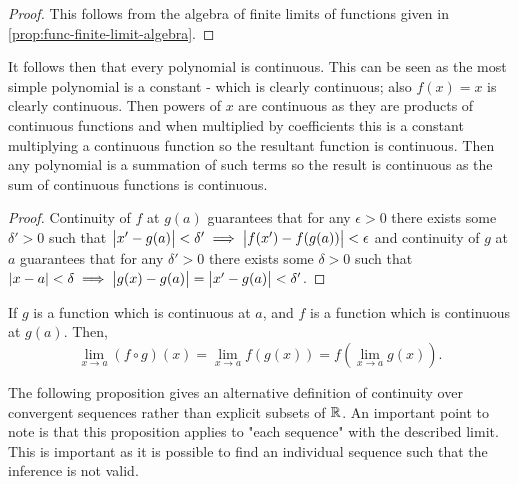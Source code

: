 \documentclass[../MathsNotesBase.tex]{subfiles}
\begin{document}
	\begin{proof}
		This follows from the algebra of finite limits of functions given in \autoref{prop:func-finite-limit-algebra}.
	\end{proof}

	\begin{corollary}
		It follows then that every polynomial is continuous. This can be seen as the most simple polynomial is a constant - which is clearly continuous; also ${ f(x) = x }$ is clearly continuous. Then powers of $x$ are continuous as they are products of continuous functions and when multiplied by coefficients this is a constant multiplying a continuous function so the resultant function is continuous. Then any polynomial is a summation of such terms so the result is continuous as the sum of continuous functions is continuous.
	\end{corollary}

	\begin{proof}
		Continuity of $f$ at $g(a)$ guarantees that for any ${ \epsilon > 0 }$ there exists some ${ \delta' > 0 }$ such that ${ \left\lvert x' - g(a)\right\rvert < \delta' \implies \left\lvert f(x') - f(g(a))\right\rvert < \epsilon }$ and continuity of $g$ at $a$ guarantees that for any ${ \delta' > 0 }$ there exists some ${ \delta > 0 }$ such that ${ \left\lvert x - a\right\rvert < \delta \implies \left\lvert g(x) - g(a)\right\rvert = \left\lvert x' - g(a)\right\rvert < \delta' }$.
	\end{proof}
	\begin{corollary}
		If $ g $ is a function which is continuous at $ a $, and $ f $ is a function which is
		continuous at $ g(a) $. Then,
		\[ \lim_{x \to a} (f \circ g)(x) = \lim_{x \to a} f(g(x)) = f(\lim_{x \to a} g(x)). \]
	\end{corollary}

	\nl[12]
	\label{ssssection:continuity-over-sequences}
	\nl[4]
	The following proposition gives an alternative definition of continuity over convergent sequences rather than explicit subsets of $\mathbb{R}^{}$. An important point to note is that this proposition applies to "each sequence" with the described limit. This is important as it is possible to find an individual sequence such that the inference is not valid.\\
	
\end{document}
